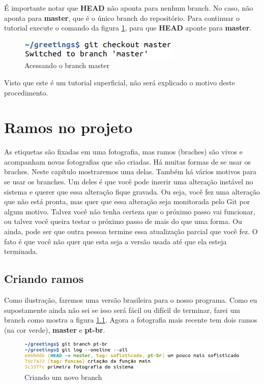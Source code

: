 \documentclass[a4paper]{book}
\begin{document}
É importante notar que \textbf{HEAD} não aponta para nenhum
branch. No caso, não aponta para \textbf{master}, que é 
o único branch do repositório.
Para continuar o tutorial execute o comando da
figura \ref{fig:29}, para que \textbf{HEAD} aponte para 
\textbf{master}.

\begin{figure}[ht]
\caption{Acessando o branch master}
\label{fig:29}
\centering
\includegraphics[scale=0.6,left]{"images/29-Acessando o branch master.png"}
\end{figure}

Visto que este é um tutorial superficial, não será explicado o motivo deste procedimento.

\chapter{Ramos no projeto}

As etiquetas são fixadas em uma fotografia, mas ramos
(braches) são vivos e acompanham novas fotografias que 
são criadas.
Há muitas formas de se usar os braches.
Neste capítulo mostraremos uma delas.
Também há vários motivos para se usar os branches.
Um deles é que você pode inserir uma alteração instável
no sistema e querer que essa alteração fique gravada.
Ou seja, você fez uma alteração que não está pronta,
mas quer que essa alteração seja monitorada pelo Git por
algum motivo.
Talvez você não tenha certeza que o próximo passo vai funcionar,
ou talvez você queira testar o próximo passo de mais do que uma
forma. Ou ainda, pode ser que outra pessoa termine essa 
atualização parcial que você fez.
O fato é que você não quer que esta seja a versão usada até 
que ela esteja terminada.

\section{Criando ramos}

Como ilustração, faremos uma versão brasileira para o nosso
programa. Como eu supostamente ainda não sei se isso será
fácil ou difícil de terminar, farei um branch como mostra a
figura \ref{fig:30}.
Agora a fotografia mais recente tem dois ramos (na cor verde),
\textbf{master} e \textbf{pt-br}.

\begin{figure}[ht]
\caption{Criando um novo branch}
\label{fig:30}
\centering
\includegraphics[scale=0.6,left]{"images/30-Criando um novo branch.png"}
\end{figure}
\end{document}
